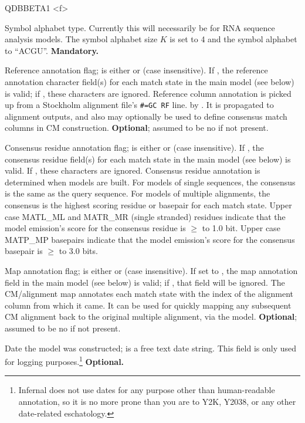\begin{sreitems}{QDBBETA1 <f>}
\item [\emprog{ALPH <s>}] Symbol alphabet type. Currently this will
necessarily be  for RNA sequence analysis models.
The symbol alphabet size $K$ is set to 4 and the 
symbol alphabet to ``ACGU''. \textbf{Mandatory.}

\item [\emprog{RF <s>}] Reference annotation flag;  is
either  or  (case insensitive). If , the
reference annotation character field(s) for each match state in the
main model (see below) is valid; if , these characters are
ignored.  Reference column annotation is picked up from a Stockholm
alignment file's \verb+#=GC RF+ line. by . It is
propagated to alignment outputs, and also may optionally be used to
define consensus match columns in CM 
construction. \textbf{Optional}; assumed to be no if not present.

\item [\emprog{CONS <s>}] Consensus residue annotation flag;
   is either  or  (case insensitive).  If
  , the consensus residue field(s) for each match state in
  the main model (see below) is valid. If , these characters
  are ignored. Consensus residue annotation is determined when models
  are built. For models of single sequences, the consensus is the same
  as the query sequence. For models of multiple alignments, the
  consensus is the highest scoring residue or basepair for each match
  state. Upper case MATL\_ML and MATR\_MR (single stranded) residues
  indicate that the model emission's score for the consensus residue
  is $\geq$ to 1.0 bit. Upper case MATP\_MP basepairs indicate that
  the model emission's score for the consensus basepair is $\geq$ to
  3.0 bits.

\item [\emprog{MAP <s>}] Map annotation flag;  is either
 or  (case insensitive).  If set to , the
map annotation field in the main model (see below) is valid; if
, that field will be ignored.  The CM/alignment map
annotates each match state with the index of the alignment column from
which it came. It can be used for quickly mapping any subsequent
CM alignment back to the original multiple alignment, via the model.
\textbf{Optional}; assumed to be no if not present.

\item [\emprog{DATE <s>}] Date the model was constructed; 
is a free text date string.  This field is only used for logging
purposes.\footnote{Infernal does not use dates for any purpose other than
human-readable annotation, so it is no more prone than you are to Y2K,
Y2038, or any other date-related eschatology.} \textbf{Optional.}


\end{sreitems}

